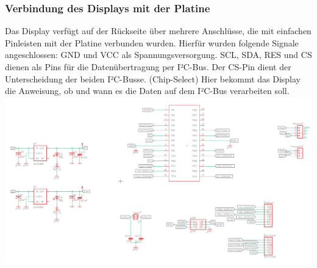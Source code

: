 \subsubsection{Verbindung des Displays mit der Platine}
Das Display verfügt auf der Rückseite über mehrere Anschlüsse, die mit einfachen Pinleisten mit der Platine verbunden wurden. Hierfür wurden folgende Signale angeschlossen: GND und VCC als Spannungsversorgung. SCL, SDA, RES und CS dienen als Pins für die Datenübertragung per I²C-Bus. Der CS-Pin dient der Unterscheidung der beiden I²C-Busse. (Chip-Select) Hier bekommt das Display die Anweisung, ob und wann es die Daten auf dem I²C-Bus verarbeiten soll.\\
\includegraphics[width=\textwidth]{./Hauptteil/hw/schematic.png}
